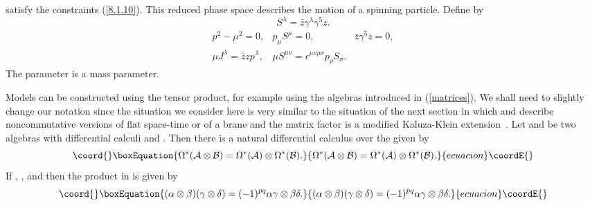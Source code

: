 \documentclass[a4paper,12pt]{article}
\def\h#1{\hat #1}
\def\c#1{{\cal #1}}
\begin{document}
satisfy the constraints (\ref{8.1.10}). This reduced phase space
describes the motion of a spinning particle. Define \coordHE{} by
$$
S^{\lambda} = \bar z \gamma^{\lambda} \gamma^5 z.           %
$$\coord{}\coordE{}$$
\begin{array}{lll}
p^2 - \mu^2 = 0, &p_{\mu} S^{\mu} = 0, &\bar z \gamma^5 z = 0, \\[4pt]
\mu J^{\lambda} = \bar z z p^{\lambda},
&\mu S^{\mu\nu} = \epsilon^{\mu\nu\rho\sigma} p_{\rho} S_{\sigma}.
\end{array}
$$
The parameter \myHighlight{$\mu$}\coordHE{} is a mass parameter. 

Models can be constructed using the tensor product, for example using
the algebras introduced in (\ref{matrices}). We shall need to slightly
change our notation since the situation we consider here is very
similar to the situation of the next section in which \myHighlight{$\c{A}$}\coordHE{} and
\myHighlight{$\h{\c}{A}$}\coordHE{} describe noncommutative versions of flat space-time or of
a brane and the matrix factor is a modified Kaluza-Klein
extension~\cite{Mad89c}.  Let \myHighlight{$\c{A}$}\coordHE{} and \myHighlight{$\c{B}$}\coordHE{} be two algebras with
differential calculi \myHighlight{$\Omega^*(\c{A})$}\coordHE{} and \myHighlight{$\Omega^*(\c{B})$}\coordHE{}. Then
there is a natural differential calculus over the \myHighlight{$\c{A} \otimes
\c{B}$}\coordHE{} given by
\begin{equation}\coord{}\boxEquation{
\Omega^*(\c{A} \otimes \c{B}) = 
\Omega^*(\c{A}) \otimes \Omega^*(\c{B}).                   \label{3.3.1}
}{
\Omega^*(\c{A} \otimes \c{B}) = 
\Omega^*(\c{A}) \otimes \Omega^*(\c{B}).                   }{ecuacion}\coordE{}\end{equation}
If \myHighlight{$\alpha \in \Omega^* (\c{A})$}\coordHE{}, \myHighlight{$\beta \in \Omega^p (\c{B})$}\coordHE{},
\myHighlight{$\gamma \in \Omega^q (\c{A})$}\coordHE{} and \myHighlight{$\delta \in \Omega^* (\c{B})$}\coordHE{} then
the product in \myHighlight{$\Omega^*(\c{A}) \otimes \Omega^*(\c{B})$}\coordHE{} is given by
\begin{equation}\coord{}\boxEquation{
(\alpha \otimes \beta)(\gamma \otimes \delta) 
= (-1)^{pq} \alpha\gamma \otimes \beta\delta.             \label{3.3.2}
}{
(\alpha \otimes \beta)(\gamma \otimes \delta) 
= (-1)^{pq} \alpha\gamma \otimes \beta\delta.             }{ecuacion}\coordE{}\end{equation}
\end{document}
